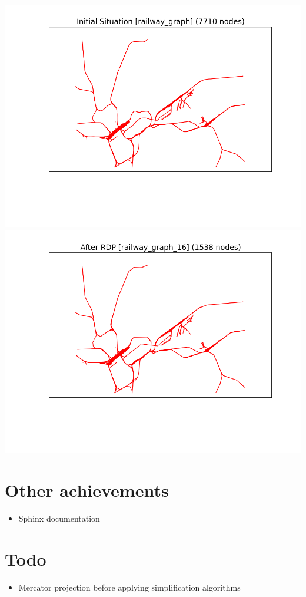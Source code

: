 \documentclass[twoside]{scrartcl}
\begin{document}
\includegraphics[scale=0.49]{rdprg-1.png}
\includegraphics[scale=0.49]{rdprg-2.png}

\section{Other achievements}
\begin{itemize}
    \item Sphinx documentation
\end{itemize}

\section{Todo}
\begin{itemize}
    \item Mercator projection before applying simplification algorithms
\end{itemize}
\end{document}
